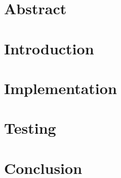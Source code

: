 \documentclass[12pt]{report}
\author{Chiemerie Ezechukwu}
\begin{document}
  

  \chapter*{Abstract}
  


  \renewcommand{\contentsname}{Table of Contents}
  \setlength{\parskip}{0pt}
  \tableofcontents
  \listoffigures
  \printacronyms

  \setlength{\parskip}{\baselineskip}

  \chapter{Introduction}
  

  \chapter{Implementation}
  

  \chapter{Testing}
  

  \chapter{Conclusion}
  


  
  \renewcommand{\bibname}{References}
  
\end{document}
